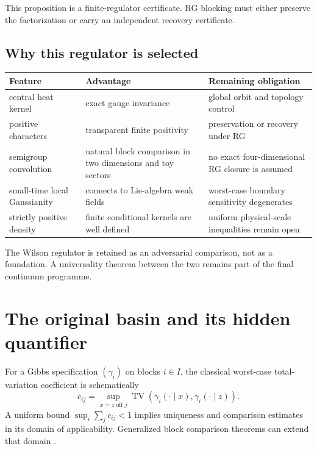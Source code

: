 \documentclass[11pt]{article}
\newcommand{\TV}{\operatorname{TV}}
\theoremstyle{remark}
\begin{document}
This proposition is a finite-regulator certificate.  RG blocking must either
preserve the factorization or carry an independent recovery certificate.

\subsection{Why this regulator is selected}

\begin{center}
\small
\begin{tabular}{p{}p{}p{}}
\toprule
Feature & Advantage & Remaining obligation\\
\midrule
central heat kernel & exact gauge invariance & global orbit and topology control\\
positive characters & transparent finite positivity & preservation or recovery under RG\\
semigroup convolution & natural block comparison in two dimensions and toy sectors & no exact four-dimensional RG closure is assumed\\
small-time local Gaussianity & connects to Lie-algebra weak fields & worst-case boundary sensitivity degenerates\\
strictly positive density & finite conditional kernels are well defined & uniform physical-scale inequalities remain open\\
\bottomrule
\end{tabular}
\end{center}

The Wilson regulator is retained as an adversarial comparison, not as a
foundation.  A universality theorem between the two remains part of the final
continuum programme.

\section{The original basin and its hidden quantifier}

For a Gibbs specification $(\gamma_i)$ on blocks $i\in I$, the classical
worst-case total-variation coefficient is schematically
\begin{equation}\label{eq:naive}
 c_{ij}=\sup_{x=z\text{ off }j}
 \TV\!\left(\gamma_i(\cdot\mid x),
             \gamma_i(\cdot\mid z)\right).
\end{equation}
A uniform bound $\sup_i\sum_jc_{ij}<1$ implies uniqueness and comparison
estimates in its domain of applicability.  Generalized block comparison
theorems can extend that domain \cite{RebeschiniVanHandel}.
\end{document}
